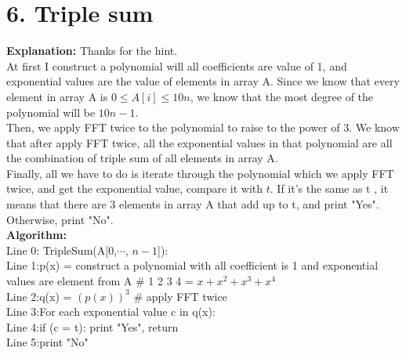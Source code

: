 \documentclass[11pt]{article}
\newcommand{\tab}{\hspace*{2em}}
\begin{document}
\newpage
\section*{6. Triple sum}
\noindent
\textbf{Explanation:}
Thanks for the hint.\\
At first I construct a polynomial will all coefficients are value of 1, and exponential values are the value of elements in array A. Since we know that every element in array A is $0 \leqslant A[i] \leqslant 10n$, we know that the most degree of the polynomial will be $10n-1$.\\
Then, we apply FFT twice to the polynomial to raise to the power of 3. We know that after apply FFT twice, all the exponential values in that polynomial are all the combination of triple sum of all elements in array A.\\
Finally, all we have to do is iterate through the polynomial which we apply FFT twice, and get the exponential value, compare it with $t$. If it's the same as t , it means that there are 3 elements in array A that add up to t, and print "Yes". Otherwise, print "No".\\

\noindent
\textbf{Algorithm:}\\
Line 0: TripleSum(A[0,$\cdots$, $n - 1$]):\\
Line 1:\tab p(x) = construct a polynomial with all coefficient is 1 and exponential values are element from A \# 1 2 3 4 = $x + x^2 + x^3 + x^4$\\
Line 2:\tab q(x) = $(p(x))^3$ \# apply FFT twice\\
Line 3:\tab For each exponential value c in q(x):\\
Line 4:\tab\tab if (c = t): print "Yes", return\\
Line 5:\tab print "No"\\
\\
\end{document}
